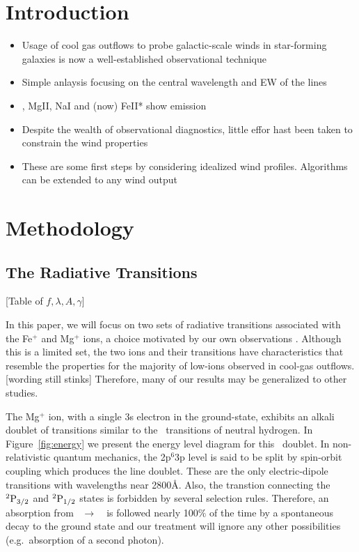\documentclass[12pt,preprint]{aastex}
\begin{document}

\section{Introduction}

\begin{itemize}
\item Usage of cool gas outflows to probe galactic-scale winds in
  star-forming galaxies is now a well-established observational
  technique
\item Simple anlaysis focusing on the central wavelength and EW of the
  lines
\item \lya, MgII, NaI and (now) FeII* show emission
\item Despite the wealth of observational diagnostics, little effor
  hast been taken to constrain the wind properties
\item These are some first steps by considering idealized wind
  profiles.  Algorithms can be extended to any wind output
\end{itemize}

\section{Methodology}
\label{sec:method}

\subsection{The Radiative Transitions}

[Table of $f,\lambda,A,\gamma$]

In this paper, we will focus on two sets of radiative transitions
associated with the Fe$^+$ and Mg$^+$ ions, a choice motivated by 
our own observations \citep{rubin10b}.  Although this is a limited
set, the two ions and their transitions have 
characteristics that resemble the properties for the majority of low-ions 
observed in cool-gas outflows. [wording still stinks] Therefore, many
of our results may be generalized to other studies.

The Mg$^+$ ion, with a single 3s electron in the ground-state,
exhibits an alkali doublet of transitions similar to the
\lya\ transitions of neutral hydrogen.  In Figure~\ref{fig:energy}
we present the energy level diagram for this 
\mgiid\ doublet.  In non-relativistic quantum
mechanics, the 2p$^6$3p level is said to be split by spin-orbit
coupling which produces the line doublet.  These are the only
 electric-dipole transitions 
with wavelengths near 2800\AA. Also, the transtion connecting
the $\rm {}^2P_{3/2}$ and $\rm {}^2P_{1/2}$ states is forbidden by several
selection rules.  Therefore, an absorption from
\maconfig~$\to$~\mbconfig\
is followed nearly 100$\%$ of the time by a spontaneous decay to the
ground state and our treatment will ignore any other possibilities
(e.g.\ absorption of a second photon).
\end{document}
